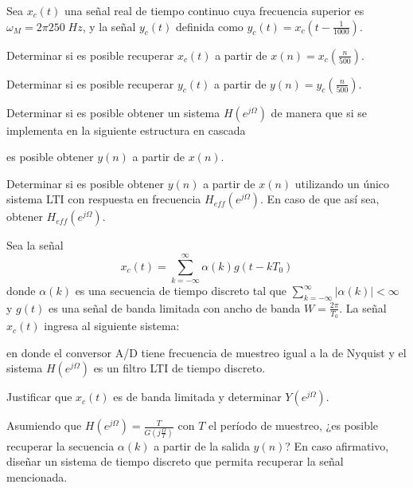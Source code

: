 \begin{ejercicio}
    Sea $x_c(t)$ una señal real de tiempo continuo cuya frecuencia superior es $\omega_M = 2\pi 250\mathrm\;{Hz}$, y la señal $y_c(t)$ definida como $y_c(t) = x_c(t - \frac{1}{1000})$.
    
    \inciso Determinar si es posible recuperar $x_c(t)$ a partir de $x(n)=x_c(\frac{n}{500})$.
    
    \inciso Determinar si es posible recuperar $y_c(t)$ a partir de $y(n)=y_c(\frac{n}{500})$.
    
    \inciso Determinar si es posible obtener un sistema $H(e^{j\Omega})$ de manera que si se implementa en la siguiente estructura en cascada
    \begin{center}
        
    \end{center}
    es posible obtener $y(n)$ a partir de $x(n)$.
    
    \inciso Determinar si es posible obtener $y(n)$ a partir de $x(n)$ utilizando un único sistema LTI con respuesta en frecuencia $H_{eff}(e^{j\Omega})$. En caso de que así sea, obtener $H_{eff}(e^{j\Omega})$.
    
\end{ejercicio}

\begin{ejercicio}
    Sea la señal
    \begin{equation*}
        x_c(t) = \sum_{k=-\infty}^{\infty} \alpha(k) g(t - kT_0)
    \end{equation*}
    donde $\alpha(k)$ es una secuencia de tiempo discreto tal que $\sum_{k=-\infty}^{\infty} |\alpha(k)| < \infty$ y $g(t)$ es una señal de banda limitada con ancho de banda $W = \frac{2 \pi}{T_0}$. La señal $x_c(t)$ ingresa al siguiente sistema:
    \begin{center}
        
    \end{center}
    en donde el conversor A/D tiene frecuencia de muestreo igual a la de Nyquist y el sistema $H(e^{j\Omega})$ es un filtro LTI de tiempo discreto.

    \inciso Justificar que $x_c(t)$ es de banda limitada y determinar $Y(e^{j\Omega})$.

    \inciso Asumiendo que $H(e^{j\Omega}) = \frac{T}{G(j\frac{\Omega}{T})}$ con $T$ el período de muestreo, ¿es posible recuperar la secuencia $\alpha(k)$ a partir de la salida $y(n)$? En caso afirmativo, diseñar un sistema de tiempo discreto que permita recuperar la señal mencionada.
\end{ejercicio}

